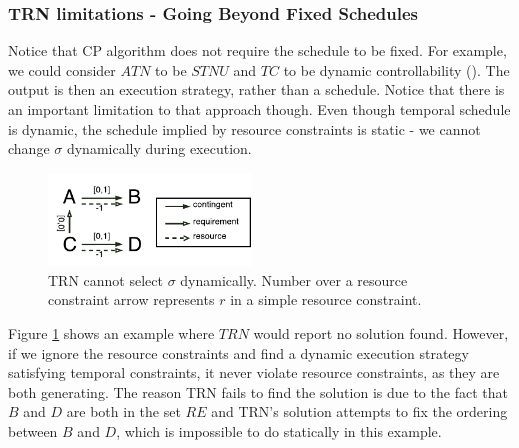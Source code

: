 \subsubsection{TRN limitations - Going Beyond Fixed Schedules}
Notice that CP algorithm does not require the schedule to be fixed. For example, we could consider $ATN$ to be $STNU$ and $TC$ to be dynamic controllability (\cite{vidal1996dealing}). The output is then an execution strategy, rather than a schedule. Notice that there is an important limitation to that approach though. Even though temporal schedule is dynamic, the schedule implied by resource constraints is static - we cannot change $\sigma$ dynamically during execution.

\begin{figure}[H]
\begin{center}
\includegraphics[width=0.48\textwidth,trim={0.23cm 0.23cm 0.00cm 0.37cm},clip]{stnu_counter}
\caption{TRN cannot select $\sigma$ dynamically. Number over a resource constraint arrow represents $r$ in a simple resource constraint.}
\label{fig:stnu_counter}
\end{center}
\end{figure}

Figure \ref{fig:stnu_counter} shows an example where $TRN$ would report no solution found. However, if we ignore the resource constraints and find a dynamic execution strategy satisfying temporal constraints, it never violate resource constraints, as they are both generating. The reason TRN fails to find the solution is due to the fact that $B$ and $D$ are both in the set $RE$ and TRN's solution attempts to fix the ordering between $B$ and $D$, which is impossible to do statically in this example.


